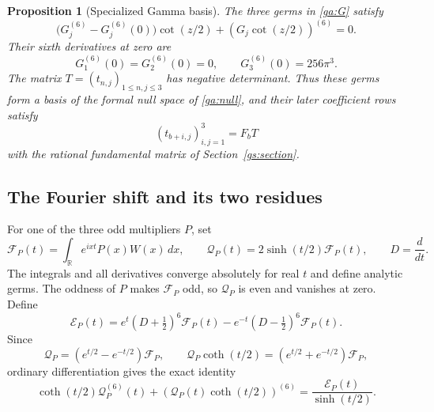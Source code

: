 \documentclass[11pt,a4paper]{article}
\newtheorem{proposition}[theorem]{Proposition}
\theoremstyle{definition}
\theoremstyle{remark}
\numberwithin{equation}{section}
\begin{document}
\begin{proposition}[Specialized Gamma basis]\label{ga:basis}
The three germs in \eqref{ga:G} satisfy
\begin{equation}\label{ga:null}
 \bigl(G_j^{(6)}-G_j^{(6)}(0)\bigr)\cot(z/2)
                    +(G_j\cot(z/2))^{(6)}=0.
\end{equation}
Their sixth derivatives at zero are
\begin{equation}\label{ga:top}
 G_1^{(6)}(0)=G_2^{(6)}(0)=0,
 \qquad G_3^{(6)}(0)=256\pi^3.
\end{equation}
The matrix $T=(t_{n,j})_{1\le n,j\le3}$ has negative determinant.
Thus these germs form a basis of the formal null space of
\eqref{ga:null}, and their later coefficient rows satisfy
\[
                     (t_{b+i,j})_{i,j=1}^3=F_bT
\]
with the rational fundamental matrix of Section~\ref{gs:section}.
\end{proposition}

\subsection{The Fourier shift and its two residues}

For one of the three odd multipliers $P$, set
\[
 \mathcal F_P(t)=\int_{\mathbb R}e^{ixt}P(x)W(x)\,dx,
 \qquad \mathcal Q_P(t)=2\sinh(t/2)\mathcal F_P(t),
 \qquad D=\frac{d}{dt}.
\]
The integrals and all derivatives converge absolutely for real $t$
and define analytic germs.  The oddness of $P$ makes $\mathcal F_P$
odd, so $\mathcal Q_P$ is even and vanishes at zero.  Define
\[
 \mathcal E_P(t)=e^t(D+\tfrac12)^6\mathcal F_P(t)
                        -e^{-t}(D-\tfrac12)^6\mathcal F_P(t).
\]
Since
\[
 \mathcal Q_P=(e^{t/2}-e^{-t/2})\mathcal F_P,
 \qquad \mathcal Q_P\coth(t/2)
              =(e^{t/2}+e^{-t/2})\mathcal F_P,
\]
ordinary differentiation gives the exact identity
\begin{equation}\label{ga:operator}
 \coth(t/2)\mathcal Q_P^{(6)}(t)
       +(\mathcal Q_P(t)\coth(t/2))^{(6)}
                  =\frac{\mathcal E_P(t)}{\sinh(t/2)}.
\end{equation}
\end{document}
